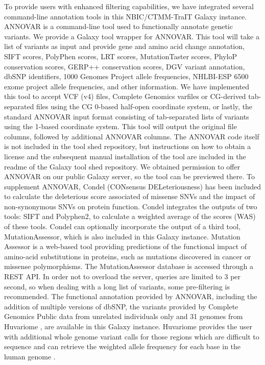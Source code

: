 To provide users with enhanced filtering capabilities, we have integrated several command-line annotation tools in this NBIC/CTMM-TraIT Galaxy instance. ANNOVAR \cite{annovar} is a command-line tool used to functionally annotate genetic variants. We provide a Galaxy tool wrapper for ANNOVAR. This tool will take a list of variants as input and provide gene and amino acid change annotation, SIFT scores, PolyPhen scores, LRT scores, MutationTaster scores, PhyloP conservation scores, GERP++ conservation scores, DGV variant annotation, dbSNP identifiers, 1000 Genomes Project allele frequencies, NHLBI-ESP 6500 exome project allele frequencies, and other information. We have implemented this tool to accept VCF (v4) files, Complete Genomics varfiles or CG-derived tab-separated files using the CG 0-based half-open coordinate system, or lastly, the standard ANNOVAR input format consisting of tab-separated lists of variants using the 1-based coordinate system. This tool will output the original file columns, followed by additional ANNOVAR columns. The ANNOVAR code itself is not included in the tool shed repository, but instructions on how to obtain a license and the subsequent manual installation of the tool are included in the readme of the Galaxy tool shed repository. We obtained permission to offer ANNOVAR on our public Galaxy server, so the tool can be previewed there. To supplement ANNOVAR, Condel (CONsensus DELeteriousness) \cite{condel} has been included to calculate the deleterious score associated of missense SNVs and the impact of non-synonymous SNVs on protein function. Condel integrates the outputs of two tools: SIFT and Polyphen2, to calculate a weighted average of the scores (WAS) of these tools. Condel can optionally incorporate the output of a third tool, MutationAssessor, which is also included in this Galaxy instance. Mutation Assessor \cite{mutass} is a web-based tool providing predictions of the functional impact of amino-acid substitutions in proteins, such as mutations discovered in cancer or missense polymorphisms. The MutationAssessor database is accessed through a REST API. In order not to overload the server, queries are limited to 3 per second, so when dealing with a long list of variants, some pre-filtering is recommended. The functional annotation provided by ANNOVAR, including the addition of multiple versions of dbSNP, the variants provided by Complete Genomics Public data from unrelated individuals only \cite{url-cgftp} and 31 genomes from Huvariome \cite{huvariome}, are available in this Galaxy instance. Huvariome provides the user with additional whole genome variant calls for those regions which are difficult to sequence and can retrieve the weighted allele frequency for each base in the human genome \cite{huvariome}.



